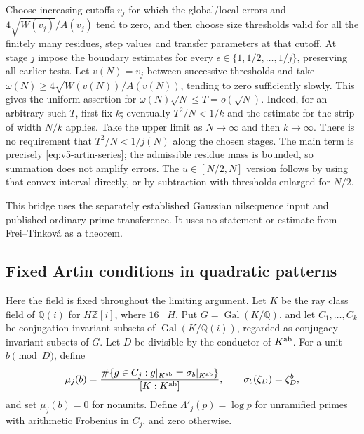 \documentclass[11pt]{article}
\theoremstyle{definition}
\theoremstyle{remark}
\newcommand{\Q}{\mathbb Q}
\newcommand{\Z}{\mathbb Z}
\begin{document}
Choose increasing cutoffs $v_j$ for which the global/local errors and
$4\sqrt{W(v_j)}/A(v_j)$ tend to zero, and then choose size thresholds
valid for all the finitely many residues, step values and transfer
parameters at that cutoff.
At stage $j$ impose the boundary estimates for every
$\epsilon\in\{1,1/2,\ldots,1/j\}$, preserving all earlier tests.
Let $v(N)=v_j$ between successive thresholds and take
$\omega(N)\geq4\sqrt{W(v(N))}/A(v(N))$, tending to zero sufficiently
slowly. This gives the uniform assertion for
$\omega(N)\sqrt N\leq T=o(\sqrt N)$.
Indeed, for an arbitrary such $T$, first fix $k$; eventually
$T^2/N<1/k$ and the estimate for the strip of width $N/k$ applies.
Take the upper limit as $N\to\infty$ and then $k\to\infty$.
There is no requirement that $T^2/N<1/j(N)$ along the chosen stages.
The main term is precisely \eqref{eq:v5-artin-series}; the admissible
residue mass is bounded, so summation does not amplify errors.
The $u\in[N/2,N]$ version follows by using that convex interval directly,
or by subtraction with thresholds enlarged for $N/2$.

This bridge uses the separately established Gaussian nilsequence input
and published ordinary-prime transference. It uses no statement or
estimate from Frei--Tinkov\'a as a theorem.


\subsection{Fixed Artin conditions in quadratic patterns}
\label{subsec:v5-artin-transfer}



Here the field is fixed throughout the limiting argument. Let $K$ be the
ray class field of $\Q(i)$ for $H\Z[i]$, where $16\mid H$. Put
$G=\operatorname{Gal}(K/\Q)$, and let $C_1,\ldots,C_k$ be
conjugation-invariant subsets of $\operatorname{Gal}(K/\Q(i))$,
regarded as conjugacy-invariant subsets of $G$.
Let $D$ be divisible by the conductor of $K^{\rm ab}$.
For a unit $b\pmod D$, define
\begin{equation}\label{eq:v5-mu}
 \mu_j(b)=\frac{\#\{g\in C_j:g|_{K^{\rm ab}}=\sigma_b|_{K^{\rm ab}}\}}
                  {[K:K^{\rm ab}]},
 \qquad \sigma_b(\zeta_D)=\zeta_D^b,
\end{equation}
and set $\mu_j(b)=0$ for nonunits. Define $\Lambda'_j(p)=\log p$ for
unramified primes with arithmetic Frobenius in $C_j$, and zero otherwise.
\end{document}

